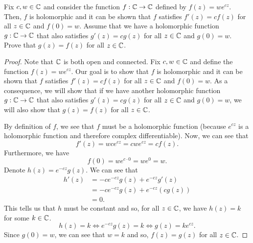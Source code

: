 \documentclass[a4paper]{article}
\begin{document}
\begin{problem}
   Fix \( c,w \in \mathbb{C}  \) and consider the function \( f: \mathbb{C} \to \mathbb{C}  \) defined by \( f(z) = w e^{cz} \). Then, \( f  \) is holomorphic and it can be shown that \( f  \) satisfies \( f'(z) = c f(z) \) for all \( z \in \mathbb{C}  \) and \( f(0) = w \). Assume that we have a holomorphic function \( g: \mathbb{C} \to \mathbb{C}  \) that also satisfies \( g'(z) = c g(z) \) for all \( z \in \mathbb{C}  \) and \( g(0) = w  \). Prove that \( g(z) = f(z)  \) for all \( z \in \mathbb{C}  \).   
\end{problem}
\begin{proof}
    Note that \( \mathbb{C}  \) is both open and connected. Fix \( c,w \in \mathbb{C} \) and define the function \( f(z) = w e^{cz} \). Our goal is to show that \( f  \) is holomorphic and it can be shown that \( f  \) satisfies \( f'(z) = c f(z) \) for all \( z \in \mathbb{C}  \) and \( f(0) = w \). As a consequence, we will show that if we have another holomorphic function \( g: \mathbb{C} \to \mathbb{C}  \) that also satisfies \( g'(z) = c g(z) \) for all \( z \in \mathbb{C}  \) and \( g(0) = w  \), we will also show that \( g(z) = f(z)  \) for all \( z \in \mathbb{C}  \).

    By definition of \( f  \), we see that \( f  \) must be a holomorphic function (because \( e^{cz} \) is a holomorphic function and therefore complex differentiable). Now, we can see that 
    \[  f'(z) = w  c e^{cz} = c w e^{cz} = c f(z).   \]
    Furthermore, we have 
    \[  f(0) = w e^{c \cdot 0} = w e^{0} = w. \]
    Denote \( h(z) = e^{-cz} g(z)  \). We can see that 
    \begin{align*}
        h'(z) &= -c e^{-cz} g(z) + e^{-cz} g'(z) \\
              &= - c e^{-cz} g(z) + e^{-cz} (c g(z)) \\
              &= 0. 
    \end{align*}
    This tells us that \( h  \) must be constant and so, for all \( z \in \mathbb{C}  \), we have \( h(z) = k  \) for some \( k \in \mathbb{C}  \).
    \[ h(z) = k \iff e^{-cz}g(z) = k \iff g(z) = k e^{cz}.  \]
    Since \( g(0) = w \), we can see that \( w = k \) and so, \( f(z) = g(z) \) for all \( z \in \mathbb{C}  \). 
\end{proof}
\end{document}
